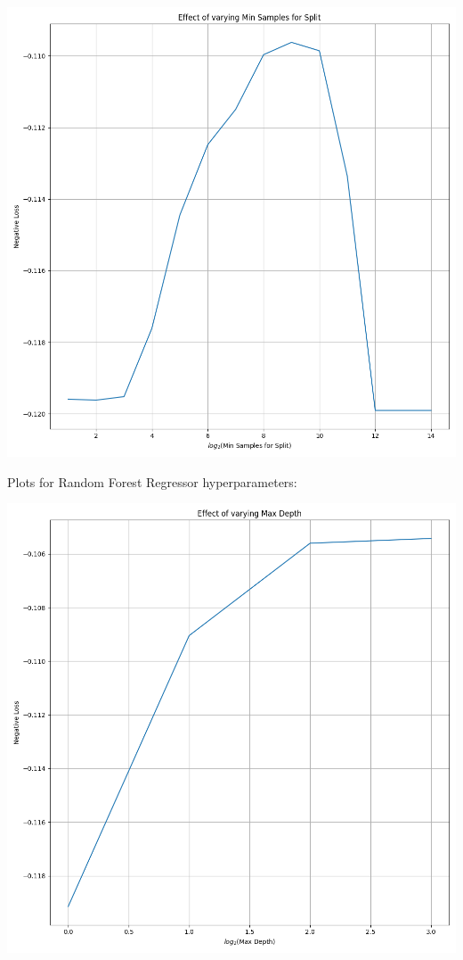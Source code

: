 \documentclass[12pt, letterpaper]{article}
\begin{document}
\includegraphics[scale=\myscale]{decision_tree_regressor_Min Samples for Split.png}

Plots for Random Forest Regressor hyperparameters:

\includegraphics[scale=\myscale]{random_forest_regressor_Max Depth.png}
\end{document}
